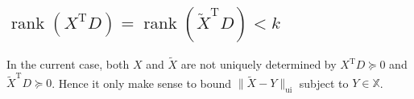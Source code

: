 \documentclass[11pt]{article}
\def\bbX{\mathbb{X}}
\def\cX{{\cal X}}
\DeclareMathOperator{\rank}{rank}
\DeclareMathOperator{\T}{T}
\DeclareMathOperator{\UI}{ui}
\def\wtd{\widetilde}
\theoremstyle{definition}
\numberwithin{equation}{section}
\numberwithin{figure}{section}
\numberwithin{table}{section}
\begin{document}
\subsection{$\rank(X^{\T}D)=\rank(\wtd X^{\T}D)<k$}


In the current case, both $X$ and $\wtd X$ are not uniquely determined by $X^{\T}D\succeq 0$ and $\wtd X^{\T}D\succeq 0$.
Hence it only make sense to bound $\|\wtd X-Y\|_{\UI}$ subject to $Y\in\bbX$.
\end{document}
